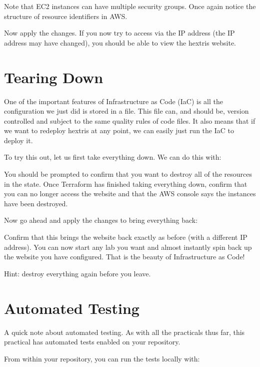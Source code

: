 \documentclass{csse4400}
\begin{document}
Note that EC2 instances can have multiple security groups.
Once again notice the structure of resource identifiers in AWS.


Now apply the changes.
If you now try to access via the IP address
(the IP address may have changed),
you should be able to view the hextris website.

\section{Tearing Down}

One of the important features of Infrastructure as Code (IaC) is all the configuration we just did is stored in a file.
This file can, and should be, version controlled and subject to the same quality rules of code files.
It also means that if we want to redeploy hextris at any point,
we can easily just run the IaC to deploy it.

To try this out, let us first take everything down.
We can do this with:

You should be prompted to confirm that you want to destroy all of the resources in the state.
Once Terraform has finished taking everything down,
confirm that you can no longer access the website and that the AWS console says the instances have been destroyed.

Now go ahead and apply the changes to bring everything back:

Confirm that this brings the website back exactly as before (with a different IP address).
You can now start any lab you want and almost instantly spin back up the website you have configured.
That is the beauty of Infrastructure as Code!

Hint: destroy everything again before you leave.

\section{Automated Testing}
A quick note about automated testing.
As with all the practicals thus far,
this practical has automated tests enabled on your repository.

From within your repository, you can run the tests locally with:
\end{document}
